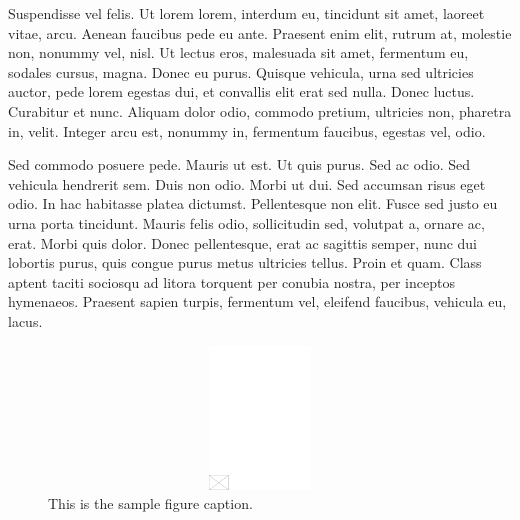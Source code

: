 \documentclass[APA,LATO1COL]{WileyNJD-v2}
\begin{document}
Suspendisse vel felis. Ut lorem lorem, interdum eu, tincidunt sit amet, laoreet vitae, arcu. Aenean faucibus pede eu
ante. Praesent enim elit, rutrum at, molestie non, nonummy vel, nisl. Ut lectus eros, malesuada sit amet, fermentum
eu, sodales cursus, magna. Donec eu purus. Quisque vehicula, urna sed ultricies auctor, pede lorem egestas dui, et
convallis elit erat sed nulla. Donec luctus. Curabitur et nunc. Aliquam dolor odio, commodo pretium, ultricies non,
pharetra in, velit. Integer arcu est, nonummy in, fermentum faucibus, egestas vel, odio.

Sed commodo posuere pede. Mauris ut est. Ut quis purus. Sed ac odio. Sed vehicula hendrerit sem. Duis non
odio. Morbi ut dui. Sed accumsan risus eget odio. In hac habitasse platea dictumst. Pellentesque non elit. Fusce
sed justo eu urna porta tincidunt. Mauris felis odio, sollicitudin sed, volutpat a, ornare ac, erat. Morbi quis dolor.
Donec pellentesque, erat ac sagittis semper, nunc dui lobortis purus, quis congue purus metus ultricies tellus. Proin
et quam. Class aptent taciti sociosqu ad litora torquent per conubia nostra, per inceptos hymenaeos. Praesent sapien
turpis, fermentum vel, eleifend faucibus, vehicula eu, lacus.

\begin{figure}
\centerline{\includegraphics[width=342pt,height=9pc,draft]{empty}}
\caption{This is the sample figure caption.\label{fig2}}
\end{figure}
\end{document}
